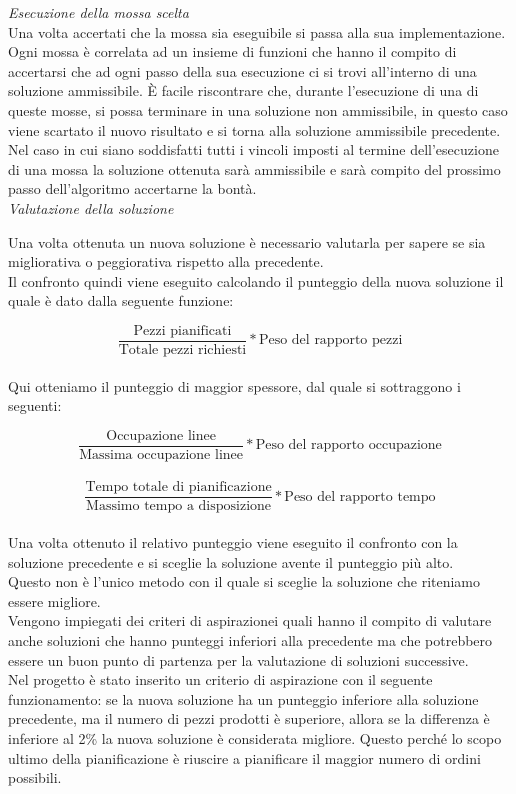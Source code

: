 \textit{Esecuzione della mossa scelta}\\
Una volta accertati che la mossa sia eseguibile si passa alla sua implementazione.\\ Ogni mossa è correlata ad un insieme di funzioni che hanno il compito di accertarsi che ad
ogni passo della sua esecuzione ci si trovi all'interno di una soluzione ammissibile. È facile riscontrare che, durante l'esecuzione di una di queste mosse, si possa terminare 
in una soluzione non ammissibile, in questo caso viene scartato il nuovo risultato e si torna alla soluzione ammissibile precedente.\\ Nel caso in cui siano soddisfatti tutti
i vincoli imposti al termine dell'esecuzione di una mossa la soluzione ottenuta sarà ammissibile e sarà compito del prossimo passo dell'algoritmo accertarne la bontà.\\

\textit{Valutazione della soluzione}

Una volta ottenuta un nuova soluzione è necessario valutarla per sapere se sia migliorativa o peggiorativa rispetto alla precedente.\\
Il confronto quindi viene eseguito calcolando il punteggio della nuova soluzione il quale è dato dalla seguente funzione:

\[\frac{\text{Pezzi pianificati}}{\text{Totale pezzi richiesti}} * \text{Peso del rapporto pezzi}\]\\

Qui otteniamo il punteggio di maggior spessore, dal quale si sottraggono i seguenti:

\[\frac{\text{Occupazione linee}}{\text{Massima occupazione linee}} * \text{Peso del rapporto occupazione}\]\\

\[\frac{\text{Tempo totale di pianificazione}}{\text{Massimo tempo a disposizione}} * \text{Peso del rapporto tempo}\]\\

Una volta ottenuto il relativo punteggio viene eseguito il confronto con la soluzione precedente e si sceglie la soluzione avente il punteggio più alto.\\
Questo non è l'unico metodo con il quale si sceglie la soluzione che riteniamo essere migliore.\\ Vengono impiegati dei criteri di aspirazione\glosp i quali hanno il compito
di valutare anche soluzioni che hanno punteggi inferiori alla precedente ma che potrebbero essere un buon punto di partenza per la valutazione di soluzioni successive.\\
Nel progetto è stato inserito un criterio di aspirazione con il seguente funzionamento: se la nuova soluzione ha un punteggio inferiore alla soluzione precedente, ma il 
numero di pezzi prodotti è superiore, allora se la differenza è inferiore al 2\% la nuova soluzione è considerata migliore. Questo perché lo scopo ultimo della pianificazione
è riuscire a pianificare il maggior numero di ordini possibili.



